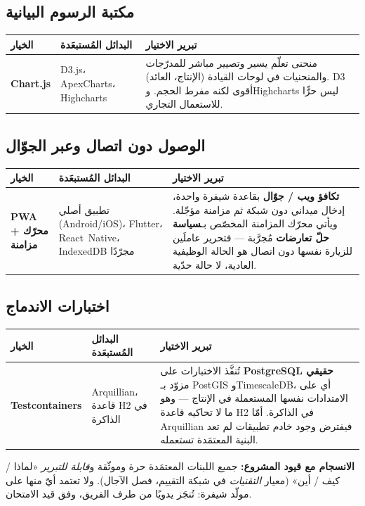 \subsection{مكتبة الرسوم البيانية}
\begin{xltabular}{\textwidth}{>{\bfseries}p{2.7cm} p{4.2cm} X}
\toprule
\textbf{الخيار} & \textbf{البدائل المُستبعَدة} & \textbf{تبرير الاختيار} \\
\midrule
\endhead
Chart.js & D3.js، ApexCharts، Highcharts & منحنى تعلّم يسير وتصيير مباشر للمدرّجات والمنحنيات في لوحات القيادة (الإنتاج، العائد). D3 أقوى لكنه مفرط الحجم. وHighcharts ليس حرًّا للاستعمال التجاري. \\
\bottomrule
\end{xltabular}

\subsection{الوصول دون اتصال وعبر الجوّال}
\begin{xltabular}{\textwidth}{>{\bfseries}p{2.7cm} p{4.2cm} X}
\toprule
\textbf{الخيار} & \textbf{البدائل المُستبعَدة} & \textbf{تبرير الاختيار} \\
\midrule
\endhead
PWA + محرّك مزامنة & تطبيق أصلي (Android/iOS)، Flutter، React~Native، IndexedDB مجرّدًا & \textbf{تكافؤ ويب / جوّال} بقاعدة شيفرة واحدة، إدخال ميداني دون شبكة ثم مزامنة مؤجّلة. ويأتي محرّك المزامنة المخصّص بـ\textbf{سياسة حلّ تعارضات} مُجرَّبة --- فتحرير عاملَين للزيارة نفسها دون اتصال هو الحالة الوظيفية العادية، لا حالة حدّية. \\
\bottomrule
\end{xltabular}

\subsection{اختبارات الاندماج}
\begin{xltabular}{\textwidth}{>{\bfseries}p{2.7cm} p{4.2cm} X}
\toprule
\textbf{الخيار} & \textbf{البدائل المُستبعَدة} & \textbf{تبرير الاختيار} \\
\midrule
\endhead
Testcontainers & Arquillian، قاعدة H2 في الذاكرة & تُنفَّذ الاختبارات على \textbf{PostgreSQL حقيقي} مزوّد بـ PostGIS وTimescaleDB، أي على الامتدادات نفسها المستعملة في الإنتاج --- وهو ما لا تحاكيه قاعدة H2 في الذاكرة. أمّا Arquillian فيفترض وجود خادم تطبيقات لم تعد البنية المعتمَدة تستعمله. \\
\bottomrule
\end{xltabular}

\begin{encadre}
\textbf{الانسجام مع قيود المشروع:} جميع اللبنات المعتمَدة حرة وموثّقة
و\emph{قابلة للتبرير} «لماذا / كيف / أين» (معيار \emph{التقنيات} في شبكة
التقييم، فصل الآجال). ولا تعتمد أيّ منها على مولّد شيفرة: تُنجَز يدويًا من طرف
الفريق، وفق قيد الامتحان.
\end{encadre}
